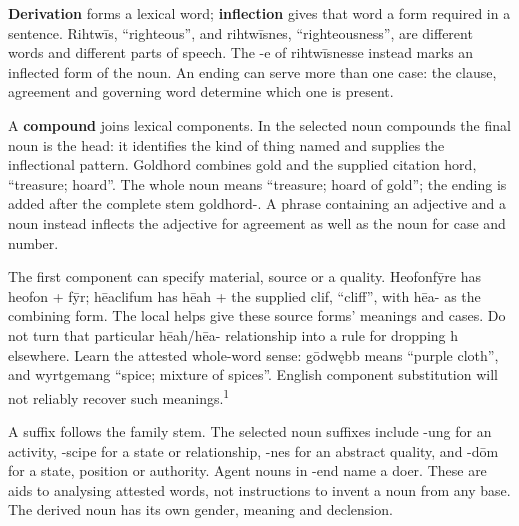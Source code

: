 \textbf{Derivation} forms a lexical word; \textbf{inflection} gives that word a form required in a sentence. Rihtwīs, “righteous”, and rihtwīsnes, “righteousness”, are different words and different parts of speech. The -e of rihtwīsnesse instead marks an inflected form of the noun. An ending can serve more than one case: the clause, agreement and governing word determine which one is present.

A \textbf{compound} joins lexical components. In the selected noun compounds the final noun is the head: it identifies the kind of thing named and supplies the inflectional pattern. Goldhord combines gold and the supplied citation hord, “treasure; hoard”. The whole noun means “treasure; hoard of gold”; the ending is added after the complete stem goldhord-. A phrase containing an adjective and a noun instead inflects the adjective for agreement as well as the noun for case and number.

The first component can specify material, source or a quality. Heofonfȳre has heofon + fȳr; hēaclifum has hēah + the supplied clif, “cliff”, with hēa- as the combining form. The local helps give these source forms’ meanings and cases. Do not turn that particular hēah/\allowbreak{}hēa- relationship into a rule for dropping h elsewhere. Learn the attested whole-word sense: gōdwębb means “purple cloth”, and wyrtgemang “spice; mixture of spices”. English component substitution will not reliably recover such meanings.\textsuperscript{1}

A suffix follows the family stem. The selected noun suffixes include -ung for an activity, -scipe for a state or relationship, -nes for an abstract quality, and -dōm for a state, position or authority. Agent nouns in -end name a doer. These are aids to analysing attested words, not instructions to invent a noun from any base. The derived noun has its own gender, meaning and declension.

